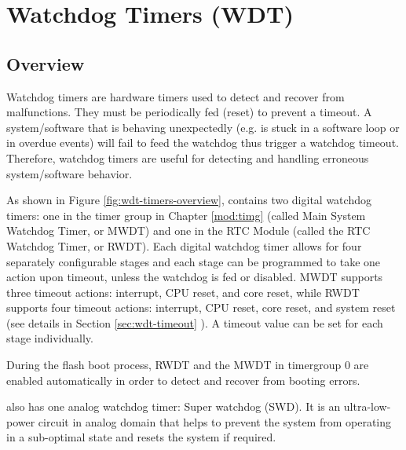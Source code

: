 \documentclass[main\_\_EN.tex]{subfiles}
\begin{document}

\ifglobal
\else
    {\let\clearpage\relax \listoftodos}
    {\let\clearpage\relax \listofdonetodos}
    \tableofcontents
\fi



\hypertarget{wdt}{}
\chapter{Watchdog Timers (WDT)}
\label{mod:wdt}

\section{Overview}

Watchdog timers are hardware timers used to detect and recover from malfunctions. They must be periodically fed (reset) to prevent a timeout. A system/software that is behaving unexpectedly (e.g. is stuck in a software loop or in overdue events) will fail to feed the watchdog thus trigger a watchdog timeout. Therefore, watchdog timers are useful for detecting and handling erroneous system/software behavior.

As shown in Figure \ref{fig:wdt-timers-overview}, \chipname{} contains two digital watchdog timers: one in the timer group in Chapter \ref{mod:timg} \textit{} (called Main System Watchdog Timer, or MWDT) and one in the RTC Module (called the RTC Watchdog Timer, or RWDT).  Each digital watchdog timer allows for four separately configurable stages and each stage can be programmed to take one action upon timeout, unless the watchdog is fed or disabled. MWDT supports three timeout actions: interrupt, CPU reset, and core reset, while RWDT supports four timeout actions: interrupt, CPU reset, core reset, and system reset (see details in Section \ref{sec:wdt-timeout} \textit{}). A timeout value can be set for each stage individually.

During the flash boot process, RWDT and the MWDT in timergroup 0 are enabled automatically in order to detect and recover from booting errors.

\chipname{} also has one analog watchdog timer: Super watchdog (SWD). It is an ultra-low-power circuit in analog domain that helps to prevent the system from operating in a sub-optimal state and resets the system if required.
\end{document}
